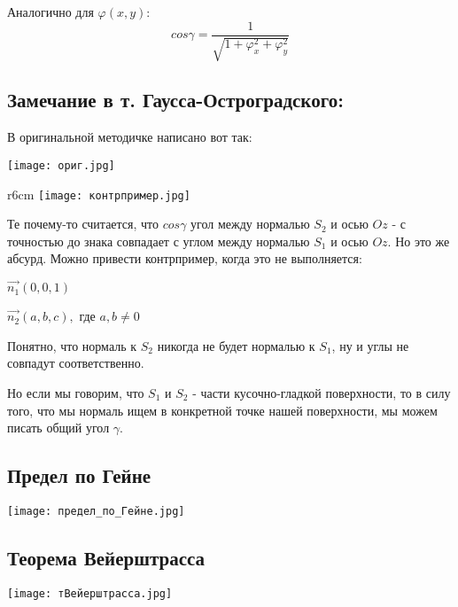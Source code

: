 \documentclass[12pt]{article}
\begin{document}
Аналогично для $\varphi(x,y)$:
$$cos\gamma = \frac{1}{\sqrt{1 + \varphi_x^2 + \varphi_y^2 }} $$

\subsection{Замечание в т. Гаусса-Остроградского:}\label{eq11}
	В оригинальной методичке написано вот так:
	
	\texttt{[image: ориг.jpg]}	
		\begin{wrapfigure}{r}{6cm}
	\texttt{[image: контрпример.jpg]}
	\end{wrapfigure}
	
	Те почему-то считается, что $cos\gamma$ угол между нормалью $S_2$ и осью $Oz$ - с точностью до знака совпадает с углом между нормалью $S_1$ и осью $Oz$. Но это же абсурд. Можно привести контрпример, когда это не выполняется:
	

	$\vec{n_1}(0 , 0 , 1)$
	
	$\vec{n_2}(a , b , c), $ где $a,b \neq 0$

	Понятно, что нормаль к $S_2$ никогда не будет нормалью к $S_1$, ну и углы не совпадут соответственно.
	
	Но если мы говорим, что $S_1$ и $S_2$ - части кусочно-гладкой поверхности, то в силу того, что мы нормаль ищем в конкретной точке нашей поверхности, мы можем писать общий угол $\gamma$.
\newpage

\subsection{Предел по Гейне} \label{eq201}
	\texttt{[image: предел\_по\_Гейне.jpg]}

\subsection{Теорема Вейерштрасса} \label{eq202}

	\texttt{[image: тВейерштрасса.jpg]}
	
	
\end{document}

